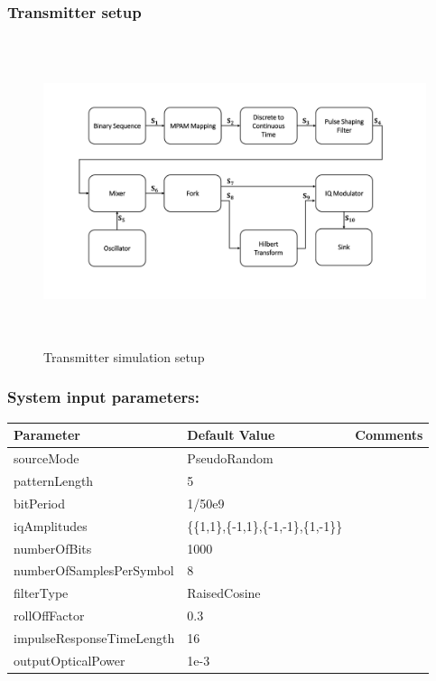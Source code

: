 \subsubsection{Transmitter setup}
\begin{center}
\begin{figure}[h]
	\centering
	\includegraphics[width=1\textwidth, height=9cm]{./sdf/simplified_coherent_receiver/figures/Simulation_setup_Tx.pdf}
	\caption{Transmitter simulation setup}\label{Simulation_setup_Tx}
\end{figure}
\end{center}
\subsubsection{System input parameters:}
\begin{center}
	\begin{tabular}{ |p{5cm}||p{4.5cm}|p{4.5cm}|  }
		\hline
		\textbf{Parameter} &  \textbf{Default Value} & \textbf{Comments}\\
		\hline
		sourceMode    & PseudoRandom &\\
		\hline
		patternLength & 5      & \\
		\hline
		bitPeriod     & 1/50e9 & \\
		\hline
		iqAmplitudes  &\{\{1,1\},\{-1,1\},\{-1,-1\},\{1,-1\}\} &\\
		\hline
		numberOfBits  &   1000 & \\
		\hline
		numberOfSamplesPerSymbol& 8  &\\
		\hline
		filterType& RaisedCosine  &\\
		\hline
		rollOffFactor & 0.3    & \\
		\hline
		impulseResponseTimeLength&16&\\
		\hline
		outputOpticalPower&1e-3&\\
		\hline
	\end{tabular}
\end{center}
\vspace{0cm}

